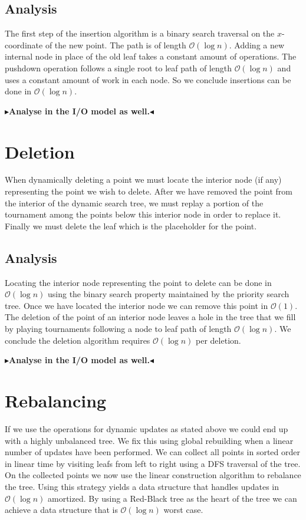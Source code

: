 \documentclass[twoside,11pt,openright]{report}
\newcommand{\todo}[1]{{\color[rgb]{.5,0,0}\textbf{$\blacktriangleright$#1$\blacktriangleleft$}}}
\begin{document}
\subsection{Analysis}

The first step of the insertion algorithm is a binary search traversal on the $x$-coordinate of the new point. The path is of length $\mathcal{O}(\log n)$. Adding a new internal node in place of the old leaf takes a constant amount of operations. The pushdown operation follows a single root to leaf path of length $\mathcal{O}(\log n)$ and uses a constant amount of work in each node. So we conclude insertions can be done in $\mathcal{O}(\log n)$.

\todo{Analyse in the I/O model as well.}

\section{Deletion}

When dynamically deleting a point we must locate the interior node (if any) representing the point we wish to delete. After we have removed the point from the interior of the dynamic search tree, we must replay a portion of the tournament among the points below this interior node in order to replace it. Finally we must delete the leaf which is the placeholder for the point.

\subsection{Analysis}
Locating the interior node representing the point to delete can be done in $\mathcal{O}(\log n)$ using the binary search property maintained by the priority search tree. Once we have located the interior node we can remove this point in $\mathcal{O}(1)$. The deletion of the point of an interior node leaves a hole in the tree that we fill by playing tournaments following a node to leaf path of length $\mathcal{O}(\log n)$. We conclude the deletion algorithm requires $\mathcal{O}(\log n)$ per deletion.

\todo{Analyse in the I/O model as well.}

\section{Rebalancing}
If we use the operations for dynamic updates as stated above we could end up with a highly unbalanced tree. We fix this using global rebuilding when a linear number of updates have been performed. We can collect all points in sorted order in linear time by visiting leafs from left to right using a DFS traversal of the tree. On the collected points we now use the linear construction algorithm to rebalance the tree. Using this strategy yields a data structure that handles updates in $\mathcal{O}(\log n)$ amortized. By using a Red-Black tree as the heart of the tree we can achieve a data structure that is $\mathcal{O}(\log n)$ worst case.
\end{document}
